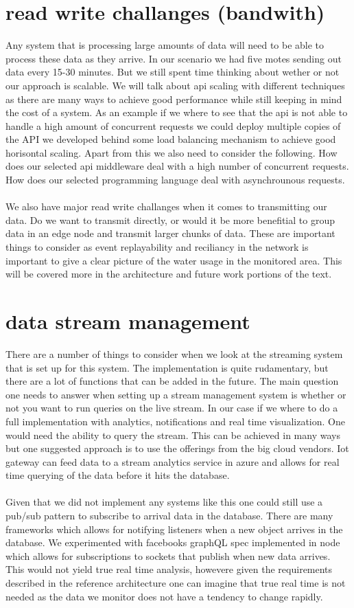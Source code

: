 \documentclass[]{uiophd}
\begin{document}
\section{read write challanges (bandwith)}

Any system that is processing large amounts of data will need to be able to process these data as they arrive. In our scenario we had five motes sending out data every 15-30 minutes. But we still spent time thinking about wether or not our approach is scalable. We will talk about api scaling with different techniques as there are many ways to achieve good performance while still keeping in mind the cost of a system. As an example if we where to see that the api is not able to handle a high amount of concurrent requests we could deploy multiple copies of the API we developed behind some load balancing mechanism to achieve good horisontal scaling. Apart from this we also need to consider the following. How does our selected api middleware deal with a high number of concurrent requests. How does our selected programming language deal with asynchrounous requests.
\\\\
We also have major read write challanges when it comes to transmitting our data. Do we want to transmit directly, or would it be more benefitial to group data in an edge node and transmit larger chunks of data. These are important things to consider as event replayability and reciliancy in the network is important to give a clear picture of the water usage in the monitored area. This will be covered more in the architecture and future work portions of the text.

\section{data stream management}
There are a number of things to consider when we look at the streaming system that is set up for this system. The implementation is quite rudamentary, but there are a lot of functions that can be added in the future. The main question one needs to answer when setting up a stream management system is whether or not you want to run queries on the live stream. In our case if we where to do a full implementation with analytics, notifications and real time visualization. One would need the ability to query the stream. This can be achieved in many ways but one suggested approach is to use the offerings from the big cloud vendors. Iot gateway can feed data to a stream analytics service in azure and allows for real time querying of the data before it hits the database.
\\\\
Given that we did not implement any systems like this one could still use a pub/sub pattern to subscribe to arrival data in the database. There are many frameworks which allows for notifying listeners when a new object arrives in the database. We experimented with facebooks graphQL spec implemented in node which allows for subscriptions to sockets that publish when new data arrives. This would not yield true real time analysis, howevere given the requirements described in the reference architecture one can imagine that true real time is not needed as the data we monitor does not have a tendency to change rapidly.
\end{document}
